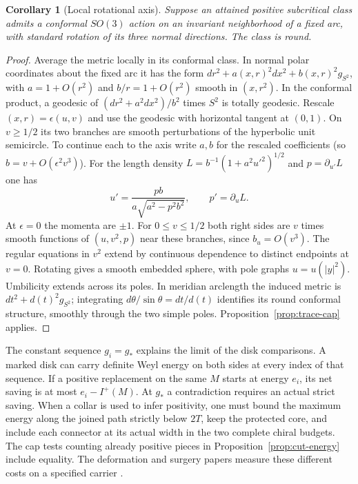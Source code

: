 \documentclass[11pt,letterpaper]{article}
\numberwithin{equation}{section}
\newtheorem{corollary}[theorem]{Corollary}
\begin{document}
\begin{corollary}[Local rotational axis]
Suppose an attained positive subcritical class admits a conformal
\(SO(3)\) action on an invariant neighborhood of a fixed arc, with
standard rotation of its three normal directions. The class is round.
\end{corollary}
\begin{proof}
Average the metric locally in its conformal class. In normal polar
coordinates about the fixed arc it has the form
\(dr^2+a(x,r)^2dx^2+b(x,r)^2g_{S^2}\), with \(a=1+O(r^2)\)
and \(b/r=1+O(r^2)\) smooth in \((x,r^2)\). In the conformal
product, a geodesic of \((dr^2+a^2dx^2)/b^2\) times \(S^2\) is
totally geodesic. Rescale \((x,r)=\epsilon(u,v)\) and use the
geodesic with horizontal tangent at \((0,1)\). On \(v\ge1/2\)
its two branches are smooth perturbations of the hyperbolic unit
semicircle. To continue each to the axis write \(a,b\) for the rescaled
coefficients (so \(b=v+O(\epsilon^2v^3)\)).
For the length density \(L=b^{-1}(1+a^2u'^2)^{1/2}\) and
\(p=\partial_{u'}L\) one has
\[
 u'=\frac{pb}{a\sqrt{a^2-p^2b^2}},\qquad p'=\partial_u L .
\]
At \(\epsilon=0\) the momenta are \(\pm1\).
For \(0\le v\le1/2\) both right sides are \(v\) times smooth
functions of \((u,v^2,p)\) near these branches, since
\(b_u=O(v^3)\). The regular equations in \(v^2\)
extend by continuous dependence to distinct endpoints at \(v=0\).
Rotating gives a smooth embedded sphere, with pole graphs
\(u=u(|y|^2)\). Umbilicity extends across its poles. In meridian
arclength the induced metric is \(dt^2+d(t)^2g_{S^2}\);
integrating \(d\theta/\sin\theta=dt/d(t)\) identifies its round
conformal structure, smoothly through the two simple poles.
Proposition~\ref{prop:trace-cap} applies.
\end{proof}

The constant sequence \(g_i=g_*\) explains the limit of the disk
comparisons. A marked disk can carry definite Weyl energy on both sides
at every index of that sequence. If a positive replacement on the same
\(M\) starts at energy \(e_i\), its net saving is at most \(e_i-I^+(M)\).
At \(g_*\) a contradiction requires an actual strict saving. When a
collar is used to infer positivity, one must bound the maximum energy
along the joined path strictly below \(2T\), keep the protected core,
and include each connector at its actual width in the two complete
chiral budgets. The cap tests counting already positive pieces in
Proposition~\ref{prop:cut-energy} include equality. The deformation
and surgery papers measure these different costs on a specified carrier
\cite{Baker2026CollarDeformation,Baker2026CollarProgram}.
\end{document}
